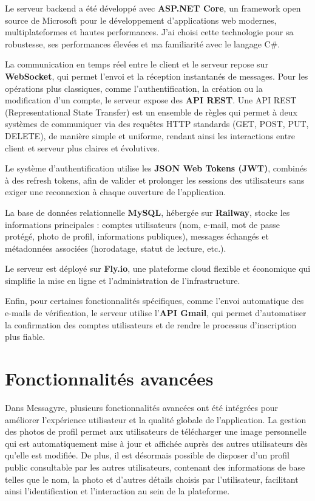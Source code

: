 \documentclass[12pt]{report}
\begin{document}
Le serveur backend a été développé avec \textbf{ASP.NET Core}\supercite{aspnetcore}, un framework open source de Microsoft pour le développement d’applications web modernes, multiplateformes et hautes performances. J’ai choisi cette technologie pour sa robustesse, ses performances élevées et ma familiarité avec le langage C\#\supercite{csharp}.

La communication en temps réel entre le client et le serveur repose sur \textbf{WebSocket}\supercite{websocket}, qui permet l’envoi et la réception instantanés de messages. Pour les opérations plus classiques, comme l’authentification, la création ou la modification d’un compte, le serveur expose des \textbf{API REST}\supercite{http}. Une API REST (Representational State Transfer) est un ensemble de règles qui permet à deux systèmes de communiquer via des requêtes HTTP standards (GET, POST, PUT, DELETE), de manière simple et uniforme, rendant ainsi les interactions entre client et serveur plus claires et évolutives.

Le système d’authentification utilise les \textbf{JSON Web Tokens (JWT)}\supercite{http}, combinés à des refresh tokens, afin de valider et prolonger les sessions des utilisateurs sans exiger une reconnexion à chaque ouverture de l’application.

La base de données relationnelle \textbf{MySQL}\supercite{mysql}, hébergée sur \textbf{Railway}\supercite{railway}, stocke les informations principales : comptes utilisateurs (nom, e-mail, mot de passe protégé, photo de profil, informations publiques), messages échangés et métadonnées associées (horodatage, statut de lecture, etc.).

Le serveur est déployé sur \textbf{Fly.io}\supercite{flyio}, une plateforme cloud flexible et économique qui simplifie la mise en ligne et l’administration de l’infrastructure.

Enfin, pour certaines fonctionnalités spécifiques, comme l’envoi automatique des e-mails de vérification, le serveur utilise l’\textbf{API Gmail}\supercite{gmailapi}, qui permet d’automatiser la confirmation des comptes utilisateurs et de rendre le processus d’inscription plus fiable.

\section{Fonctionnalités avancées}

Dans Messagyre, plusieurs fonctionnalités avancées ont été intégrées pour améliorer l'expérience utilisateur et la qualité globale de l'application. La gestion des photos de profil permet aux utilisateurs de télécharger une image personnelle qui est automatiquement mise à jour et affichée auprès des autres utilisateurs dès qu'elle est modifiée\supercite{cloudinary}. De plus, il est désormais possible de disposer d'un profil public consultable par les autres utilisateurs, contenant des informations de base telles que le nom, la photo et d'autres détails choisis par l'utilisateur, facilitant ainsi l'identification et l'interaction au sein de la plateforme.
\end{document}
